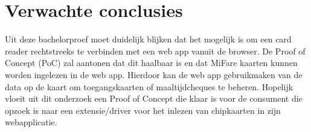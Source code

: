 \section{Verwachte conclusies}%
\label{sec:Verwachte_conclusies}
Uit deze bachelorproef moet duidelijk blijken dat het mogelijk is om een card reader rechtstreeks te verbinden met een web app vanuit de browser. De Proof of Concept (PoC) zal aantonen dat dit haalbaar is en dat MiFare kaarten kunnen worden ingelezen in de web app. Hierdoor kan de web app gebruikmaken van de data op de kaart om toegangskaarten of maaltijdcheques te beheren. Hopelijk vloeit uit dit onderzoek een Proof of Concept die klaar is voor de consument die opzoek is naar een extensie/driver voor het inlezen van chipkaarten in zijn webapplicatie.